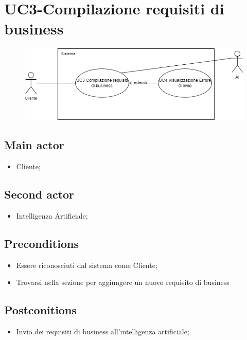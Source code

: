 \documentclass{article}
\begin{document}
    
\section{UC3-Compilazione requisiti di business}
    \begin{figure}[h]
      \centering
      \includegraphics[width=.8\textwidth, height=.6\textheight, keepaspectratio]{documenti/imgUML/UC3.png}
      \label{fig:immagine}
    \end{figure}
     \subsection*{Main actor}
     \begin{itemize}
         \item Cliente;
     \end{itemize}
      \subsection*{Second actor}
     \begin{itemize}
         \item Intelligenza Artificiale;
     \end{itemize}
     \subsection*{Preconditions} 
     \begin{itemize}
         \item Essere riconosciuti dal sistema come Cliente;
         \item Trovarsi nella sezione per aggiungere un nuovo requisito di business
     \end{itemize}
     \subsection*{Postconitions} 
        \begin{itemize}
            \item Invio dei requisiti di business all'intelligenza artificiale;
        \end{itemize}
        
\end{document}
